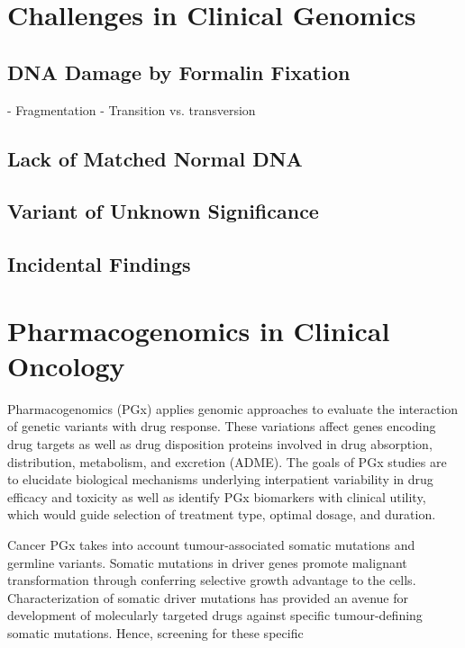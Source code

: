 \section{Challenges in Clinical Genomics}
\label{sec:ChallengesinClinicalGenomics}

\subsection{DNA Damage by Formalin Fixation}
- Fragmentation
- Transition vs. transversion

\subsection{Lack of Matched Normal DNA}

\subsection{Variant of Unknown Significance}

\subsection{Incidental Findings}

\section{Pharmacogenomics in Clinical Oncology}
\label{sec:PharmacogenomicsinClinicalOncology}

Pharmacogenomics (PGx) applies genomic approaches to evaluate the interaction of genetic variants with drug response. These variations affect genes encoding drug targets as well as drug disposition proteins involved in drug absorption, distribution, metabolism, and excretion (ADME). The goals of PGx studies are to elucidate biological mechanisms underlying interpatient variability in drug efficacy and toxicity as well as identify PGx biomarkers with clinical utility, which would guide selection of treatment type, optimal dosage, and duration.

Cancer PGx takes into account tumour-associated somatic mutations and germline variants. Somatic mutations in driver genes promote malignant transformation through conferring selective growth advantage to the cells. Characterization of somatic driver mutations has provided an avenue for development of molecularly targeted drugs against specific tumour-defining somatic mutations. Hence, screening for these specific


